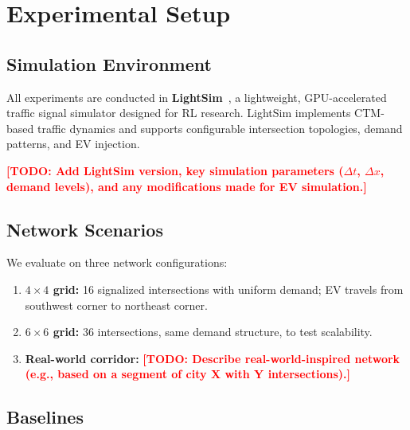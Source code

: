 \documentclass[journal]{IEEEtran}
\newcommand{\todo}[1]{\textcolor{red}{\textbf{[TODO: #1]}}}
\begin{document}
\section{Experimental Setup}
\label{sec:setup}

\subsection{Simulation Environment}
\label{sec:setup:sim}

All experiments are conducted in \textbf{LightSim}~\cite{lightsim2024},
a lightweight, GPU-accelerated traffic signal simulator designed for
RL research.  LightSim implements CTM-based traffic dynamics and
supports configurable intersection topologies, demand patterns, and
EV injection.

\todo{Add LightSim version, key simulation parameters ($\Delta t$,
$\Delta x$, demand levels), and any modifications made for EV
simulation.}

\subsection{Network Scenarios}
\label{sec:setup:networks}

We evaluate on three network configurations:
\begin{enumerate}
  \item \textbf{$4 \times 4$ grid:} 16 signalized intersections with
    uniform demand; EV travels from southwest corner to northeast
    corner.
  \item \textbf{$6 \times 6$ grid:} 36 intersections, same demand
    structure, to test scalability.
  \item \textbf{Real-world corridor:} \todo{Describe real-world-inspired
    network (e.g., based on a segment of city X with Y intersections).}
\end{enumerate}

\subsection{Baselines}
\label{sec:setup:baselines}
\end{document}
